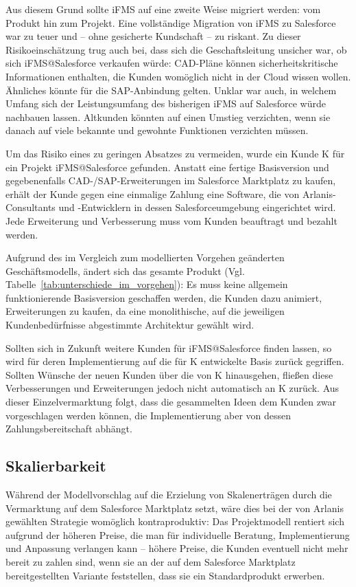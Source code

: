 Aus diesem Grund sollte iFMS auf eine zweite Weise migriert werden: vom Produkt 
hin zum Projekt. Eine vollständige Migration von iFMS zu Salesforce war zu 
teuer und -- ohne gesicherte Kundschaft -- zu riskant. Zu dieser 
Risikoeinschätzung trug auch bei, dass sich die Geschaftsleitung unsicher war, 
ob sich iFMS@Salesforce verkaufen würde: CAD-Pläne können sicherheitskritische 
Informationen enthalten, die Kunden womöglich nicht in der Cloud wissen wollen. 
Ähnliches könnte für die SAP-Anbindung gelten. Unklar war auch, in 
welchem Umfang sich der Leistungsumfang des bisherigen iFMS auf Salesforce 
würde nachbauen lassen. Altkunden könnten auf einen Umstieg verzichten, wenn 
sie danach auf viele bekannte und gewohnte Funktionen verzichten müssen. 

Um das Risiko eines zu geringen Absatzes zu vermeiden, wurde ein Kunde K für 
ein Projekt iFMS@Salesforce gefunden. Anstatt eine fertige Basisversion und 
gegebenenfalls CAD-/SAP-Erweiterungen im Salesforce Marktplatz zu kaufen, 
erhält der Kunde gegen eine einmalige Zahlung eine Software, die von 
Arlanis-Consultants und -Entwicklern in dessen Salesforceumgebung eingerichtet 
wird. 
Jede Erweiterung und Verbesserung muss vom Kunden beauftragt und bezahlt werden.

Aufgrund des im Vergleich zum modellierten Vorgehen geänderten 
Geschäftsmodells, ändert sich das gesamte Produkt (Vgl. 
Tabelle~\ref{tab:unterschiede_im_vorgehen}): Es muss keine allgemein 
funktionierende Basisversion geschaffen werden, die Kunden dazu animiert, 
Erweiterungen zu kaufen, da eine monolithische, auf die jeweiligen 
Kundenbedürfnisse abgestimmte Architektur gewählt wird.

Sollten sich in Zukunft weitere Kunden für iFMS@Salesforce finden lassen, so 
wird für deren Implementierung auf die für K entwickelte Basis zurück 
gegriffen. Sollten Wünsche der neuen Kunden über die von K hinausgehen, fließen 
diese Verbesserungen und Erweiterungen jedoch nicht automatisch an K zurück. 
Aus dieser Einzelvermarktung folgt, dass die gesammelten Ideen dem Kunden zwar 
vorgeschlagen werden können, die Implementierung aber von dessen 
Zahlungsbereitschaft abhängt.

\subsection{Skalierbarkeit}
Während der Modellvorschlag auf die Erzielung von Skalenerträgen durch die 
Vermarktung auf dem Salesforce Marktplatz setzt, wäre dies bei der von Arlanis 
gewählten Strategie womöglich kontraproduktiv: Das Projektmodell rentiert sich 
aufgrund der höheren Preise, die man für individuelle Beratung, Implementierung 
und Anpassung verlangen kann -- höhere Preise, die Kunden eventuell nicht mehr 
bereit zu zahlen sind, wenn sie an der auf dem Salesforce Marktplatz 
bereitgestellten Variante feststellen, dass sie ein Standardprodukt erwerben.

